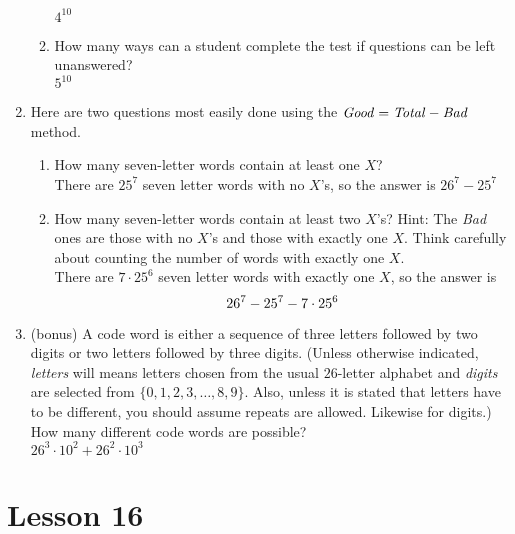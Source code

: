 \documentclass[11pt]{amsart}
\begin{document}
\begin{enumerate}
\begin{enumerate}
{\color{blue}
$4^{10}$\\[3pt]
}
\item How many ways can a student complete the test if questions 
can be left unanswered?\\[3pt]
{\color{blue}
$5^{10}$
\\[5pt]
}
\end{enumerate}

\item Here are two questions most easily done using the $\it Good = Total - Bad$ method.\\[3pt]
\begin{enumerate}
\item How many seven-letter words contain at least one $X$?\\[3pt]
{\color{blue}
There are $25^7$ seven letter words with no $X$'s, so the answer is
$26^7 - 25^7$\\[3pt]
}
\item How many seven-letter words contain at least two $X$'s?
Hint: The {\it Bad} ones are those with no $X$'s and those with exactly one $X$. 
Think carefully about counting the number of words with exactly one $X$.\\[3pt]
{\color{blue}
There are $7\cdot 25^6$ seven letter words with exactly one $X$, so the answer is
\[
26^7 - 25^7 -7\cdot 25^6\\[5pt]
\]
}

\end{enumerate}

\item (bonus) A code word is either a sequence of three letters followed
by two digits or two letters followed by three digits. (Unless otherwise
indicated, {\it letters} will means
 letters chosen from the usual
$26$-letter alphabet and {\it digits} are selected from 
$\{0,1,2,3,\dots,8,9\}$. Also, unless it is stated that letters have to be different, you should assume repeats are allowed. Likewise for digits.) How many different code words are possible?\\[3pt]

{\color{blue}
$26^3\cdot 10^2 + 26^2\cdot 10^3$\\[5pt]
}

\end{enumerate}

\vfill\break

\section{Lesson 16}
\end{document}
